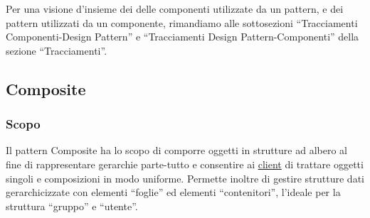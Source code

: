 Per una visione d'insieme dei delle componenti utilizzate da un pattern, e dei pattern utilizzati da un componente, rimandiamo alle sottosezioni ``Tracciamenti Componenti-Design Pattern'' e ``Tracciamenti Design Pattern-Componenti'' della sezione ``Tracciamenti''.



\subsection{Composite}
\subsubsection{Scopo}
Il pattern Composite ha lo scopo di comporre oggetti in strutture ad albero al fine di rappresentare gerarchie parte-tutto e consentire ai \underline{client} di trattare oggetti singoli e composizioni in modo uniforme. Permette inoltre di gestire strutture dati gerarchicizzate con elementi ``foglie'' ed elementi ``contenitori'', l'ideale per la struttura ``gruppo'' e ``utente''.
